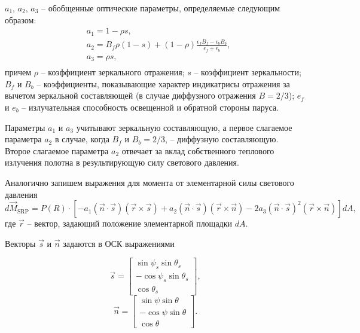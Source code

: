 $a_{1}$, $a_{2}$, $a_{3}$ -- обобщенные оптические параметры, определяемые
следующим образом:
\begin{equation}
  \begin{aligned}
    & a_{1} = 1 - \rho s, \\
    & a_{2} = B_f\rho(1 - s) + (1 - \rho)\frac{\epsilon_f B_f - \epsilon_b B_b}{\epsilon_f + \epsilon_b}, \\
    & a_{3} = \rho s, \\
  \end{aligned}
\end{equation}
причем $\rho$ -- коэффициент зеркального отражения; $s$ -- коэффициент зеркальности;
$B_f$ и $B_b$ -- коэффициенты, показывающие характер индикатрисы отражения за вычетом
зеркальной составляющей (в случае диффузного отражения $B = 2/3$); $e_f$ и $e_b$ --
излучательная способность освещенной и обратной стороны паруса.\par
  Параметры $a_{1}$ и $a_{3}$ учитывают зеркальную составляющую, а первое слагаемое
параметра $a_{2}$ в случае, когда $B_f$ и $B_b = 2/3$, -- диффузную составляющую.
Второе слагаемое параметра $a_{2}$ отвечает за вклад собственного теплового излучения
полотна в результирующую силу светового давления.\par
  Аналогично запишем выражения для момента от элементарной силы светового давления
\begin{equation}
  d\vec{M}_{\text{SRP}} = P(R) \cdot \left[
    -a_{1}(\vec{n}\cdot\vec{s})(\vec{r} \times \vec{s})
    +a_{2}(\vec{n}\cdot\vec{s})(\vec{r} \times \vec{n})
    -2a_{3}(\vec{n}\cdot\vec{s})^2(\vec{r} \times \vec{n})
  \right]dA,
\end{equation}
где $\vec{r}$ -- вектор, задающий положение элементарной площадки $dA$.\par
  Векторы $\vec{s}$ и $\vec{n}$ задаются в ОСК выражениями\par
\begin{equation} \label{eq:SunVector}
  \vec{s} = \begin{bmatrix}
     \sin\psi_s\sin\theta_s \\
    -\cos\psi_s\sin\theta_s \\
     \cos\theta_s
  \end{bmatrix},
\end{equation}
\begin{equation}
  \vec{n} = \begin{bmatrix}
     \sin\psi\sin\theta \\
    -\cos\psi\sin\theta \\
     \cos\theta
  \end{bmatrix}.
\end{equation}\par
